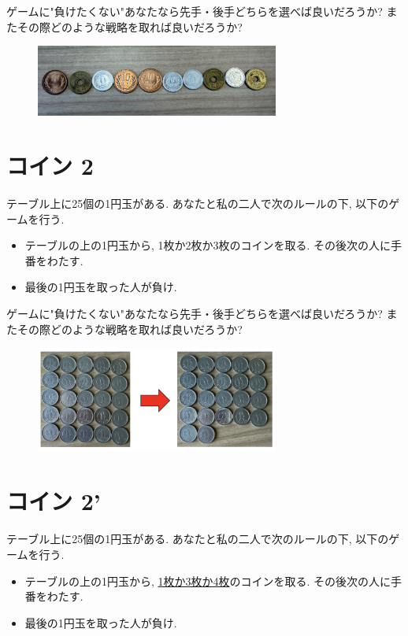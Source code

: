 \documentclass[dvipdfmx,a4paper,12pt]{article} %
\theoremstyle{definition}
\theoremstyle{remark}
\numberwithin{equation}{section}
\begin{document}
ゲームに"負けたくない"あなたなら先手・後手どちらを選べば良いだろうか?
またその際どのような戦略を取れば良いだろうか?

\begin{figure}[htbp]
\begin{center}
\includegraphics[width=80mm]{coin1.png}
\end{center}
\end{figure}

\section{コイン 2}
テーブル上に25個の1円玉がある.
あなたと私の二人で次のルールの下, 以下のゲームを行う.

\begin{itemize}
\item テーブルの上の1円玉から, 1枚か2枚か3枚のコインを取る. その後次の人に手番をわたす.
\item 最後の1円玉を取った人が負け.
\end{itemize}

ゲームに"負けたくない"あなたなら先手・後手どちらを選べば良いだろうか?
またその際どのような戦略を取れば良いだろうか?

\begin{figure}[htbp]
\begin{center}
\includegraphics[width=80mm]{coin2.png}
\end{center}
\end{figure}

\section{コイン 2'}
テーブル上に25個の1円玉がある.
あなたと私の二人で次のルールの下, 以下のゲームを行う.

\begin{itemize}
\item テーブルの上の1円玉から, \underline{1枚か3枚か4枚}のコインを取る. その後次の人に手番をわたす.
\item 最後の1円玉を取った人が負け.
\end{itemize}
\end{document}
